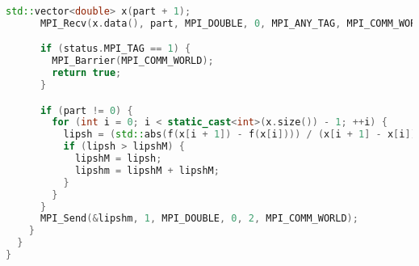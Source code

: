 \documentclass[a4paper,12pt]{article}
\begin{document}
\begin{lstlisting}[language=C++]
      std::vector<double> x(part + 1);
      MPI_Recv(x.data(), part, MPI_DOUBLE, 0, MPI_ANY_TAG, MPI_COMM_WORLD, &status);

      if (status.MPI_TAG == 1) {
        MPI_Barrier(MPI_COMM_WORLD);
        return true;
      }

      if (part != 0) {
        for (int i = 0; i < static_cast<int>(x.size()) - 1; ++i) {
          lipsh = (std::abs(f(x[i + 1]) - f(x[i]))) / (x[i + 1] - x[i]);
          if (lipsh > lipshM) {
            lipshM = lipsh;
            lipshm = lipshM + lipshM;
          }
        }
      }
      MPI_Send(&lipshm, 1, MPI_DOUBLE, 0, 2, MPI_COMM_WORLD);
    }
  }
}
\end{lstlisting}
\end{document}
